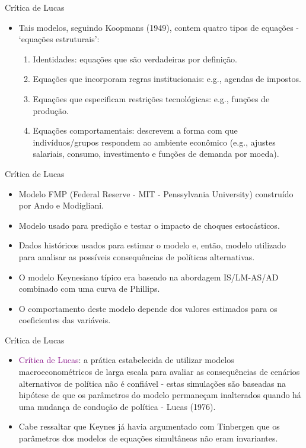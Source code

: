 \documentclass[10pt]{beamer}
\begin{document}
\begin{frame}{Crítica de Lucas}
    \begin{itemize}
        \item Tais modelos, seguindo Koopmans (1949), contem quatro tipos de equações - `equações estruturais':
        \bigskip
        \begin{enumerate}
            \item Identidades: equações que são verdadeiras por definição.
            \bigskip
            \item Equações que incorporam regras institucionais: e.g., agendas de impostos.
            \bigskip
            \item Equações que especificam restrições tecnológicas: e.g., funções de produção.
            \bigskip
            \item Equações comportamentais: descrevem a forma com que indivíduos/grupos respondem ao ambiente econômico (e.g., ajustes salariais, consumo, investimento e funções de demanda por moeda).
        \end{enumerate}
    \end{itemize}
\end{frame}

\begin{frame}{Crítica de Lucas}
    \begin{itemize}
        \item Modelo FMP (Federal Reserve - MIT - Penssylvania University) construído por Ando e Modigliani.
        \bigskip
        \item Modelo usado para predição e testar o impacto de choques estocásticos.
        \bigskip
        \item Dados históricos usados para estimar o modelo e, então, modelo utilizado para analisar as possíveis consequências de políticas alternativas.
        \bigskip
        \item O modelo Keynesiano típico era baseado na abordagem IS/LM-AS/AD combinado com uma curva de Phillips.
        \bigskip
        \item O comportamento deste modelo depende dos valores estimados para os coeficientes das variáveis.
    \end{itemize}
\end{frame}

\begin{frame}{Crítica de Lucas}
    \begin{itemize}
        \item \textcolor{purple}{Crítica de Lucas}: a prática estabelecida de utilizar modelos macroeconométricos de larga escala para avaliar as consequências de cenários alternativos de política não é confiável - estas simulações são baseadas na hipótese de que os parâmetros do modelo permaneçam inalterados quando há uma mudança de condução de política - Lucas (1976).
        \bigskip
        \item Cabe ressaltar que Keynes já havia argumentado com Tinbergen que os parâmetros dos modelos de equações simultâneas não eram invariantes.
    \end{itemize}
\end{frame}
\end{document}
